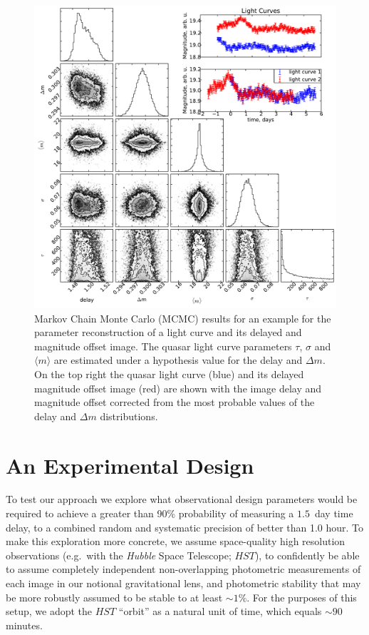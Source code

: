 \documentclass{emulateapj}
\begin{document}
\begin{figure}[t]
\begin{center}
\includegraphics[width=\linewidth]{./triangle_example.pdf}
\caption{Markov Chain Monte Carlo (MCMC) results for an example for
  the parameter reconstruction of a light curve and its delayed and
  magnitude offset image. The quasar light curve parameters $\tau$,
  $\sigma$ and $\langle m \rangle$ are estimated under a hypothesis
  value for the delay and $\Delta m$. On the top right the quasar
  light curve (blue) and its delayed magnitude offset image (red) are
  shown with the image delay and magnitude offset corrected from the
  most probable values of the delay and $\Delta m$
  distributions.}\label{fig:triangle}
\end{center}
\end{figure}

\section{An Experimental Design}\label{sec:experiment}

To test our approach we explore what observational design parameters
would be required to achieve a greater than 90\% probability of
measuring a $1.5$~day time delay, to a combined random and systematic
precision of better than 1.0 hour. To make this exploration more
concrete, we assume space-quality high resolution observations (e.g.\
with the \emph{Hubble} Space Telescope; $HST$), to confidently be able
to assume completely independent non-overlapping photometric
measurements of each image in our notional gravitational lens, and
photometric stability that may be more robustly assumed to be stable
to at least $\sim1\%$.  For the purposes of this setup, we adopt the
$HST$ ``orbit'' as a natural unit of time, which equals
$\sim90$\,minutes.
\end{document}
